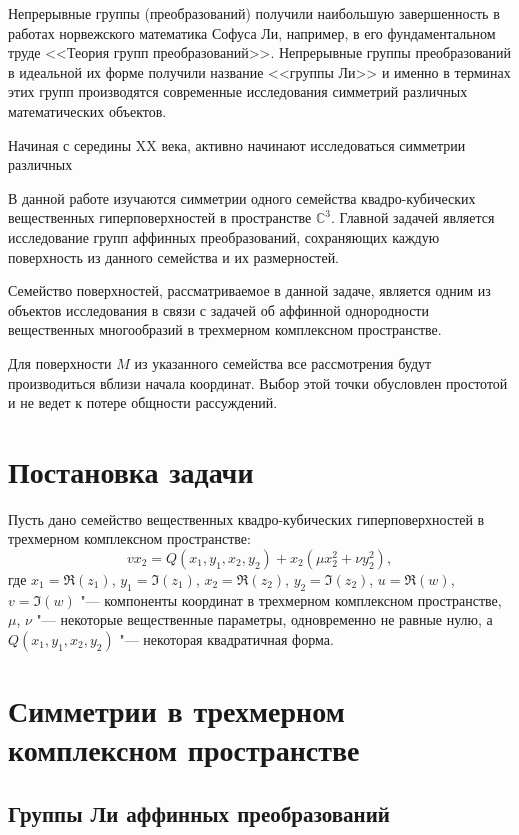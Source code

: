 \documentclass[a4paper,14pt]{extarticle}
\begin{document}
Непрерывные группы (преобразований) получили наибольшую завершенность в работах норвежского математика Софуса Ли, например, в его фундаментальном труде <<Теория групп преобразований>>. Непрерывные группы преобразований в идеальной их форме получили название <<группы Ли>> и именно в терминах этих групп производятся современные исследования симметрий различных математических объектов.

Начиная с середины XX века, активно начинают исследоваться симметрии различных 

В данной работе изучаются симметрии одного семейства квадро-кубических вещественных гиперповерхностей в пространстве $\mathbb{C}^3$. Главной задачей является исследование групп аффинных преобразований, сохраняющих каждую поверхность из данного семейства и их размерностей. 

Семейство поверхностей, рассматриваемое в данной задаче, является одним из объектов исследования в связи с задачей об аффинной однородности вещественных многообразий в трехмерном комплексном пространстве. 

Для поверхности $M$ из указанного семейства все рассмотрения будут производиться вблизи начала координат. Выбор этой точки обусловлен простотой и не ведет к потере общности рассуждений.



\section{Постановка задачи}
Пусть дано семейство вещественных квадро-кубических гиперповерхностей в трехмерном комплексном пространстве:
\begin{equation}\label{eq:initial}
v x_2 = Q(x_1, y_1, x_2, y_2) + x_2 (\mu x_2^2 + \nu y_2^2),
\end{equation}
где $x_1 = \Re(z_1)$, $y_1 = \Im(z_1)$, $x_2 = \Re(z_2)$, $y_2 = \Im(z_2)$, $u = \Re(w)$, $v= \Im(w)$ "--- компоненты координат в трехмерном комплексном пространстве, $\mu$, $\nu$ "--- некоторые вещественные параметры, одновременно не равные нулю, а $Q(x_1, y_1, x_2, y_2)$ "--- некоторая квадратичная форма. 
\section{Симметрии в трехмерном комплексном пространстве}
\lipsum[5]
\subsection{Группы Ли аффинных преобразований}
\lipsum[7]
\end{document}
